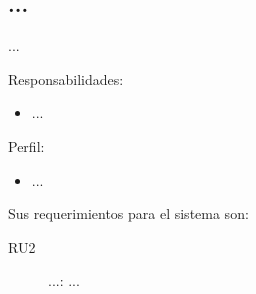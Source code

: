 \begin{Usuario}{\section{...}}{
	...
}
    \item[Responsabilidades:] \cdtEmpty
    \begin{itemize}
		\item ...
    \end{itemize}

	\item[Perfil:] \cdtEmpty
    \begin{itemize}
		\item ...
    \end{itemize}
\end{Usuario}

	Sus requerimientos para el sistema son:
\begin{description}
    \item[RU2] ...: ...
\end{description}


